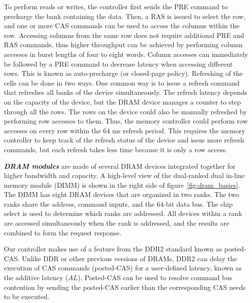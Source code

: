 To perform reads or writes, the controller first sends the PRE command to precharge the bank containing the data. 
Then, a RAS is issued to select the row, and one or more CAS commands can be used to access the columns within the row. 
Accessing columns from the same row does not require additional PRE and RAS commands, thus higher throughput can be achieved by performing column accesses in burst lengths of four to eight words.  
Column accesses can immediately be followed by a PRE command to decrease latency when accessing different rows. 
This is known as auto-precharge (or closed-page policy).
Refreshing of the cells can be done in two ways.
One common way is to issue a refresh command that refreshes all banks of the device simultaneously. 
The refresh latency depends on the capacity of the device, but the DRAM device manages a counter to step through all the rows.
The rows on the device could also be manually refreshed by performing row accesses to them.
Thus, the memory controller could perform row accesses on every row within the 64 ms refresh period.
This requires the memory controller to keep track of the refresh status of the device and issue more refresh commands, but each refresh takes less time because it is only a row access. 

\textbf{\emph{DRAM modules}} are made of several DRAM devices integrated together for higher bandwidth and capacity. 
A high-level view of the dual-ranked dual in-line memory module (DIMM) is shown in the right side of figure~\ref{fig:dram_basics}.
The DIMM has eight DRAM devices that are organized in two ranks.
The two ranks share the address, command inputs, and the 64-bit data bus.
The chip select is used to determine which ranks are addressed.
All devices within a rank are accessed simultaneously when the rank is addressed, and the results are combined to form the request response.  

Our controller makes use of a feature from the DDR2 standard known as posted-CAS.  
Unlike DDR or other previous versions of DRAMs, DDR2 can delay the execution of CAS commands (posted-CAS) for a user-defined latency, known as the additive latency ($AL$). 
Posted-CAS can be used to resolve command bus contention by sending the posted-CAS earlier than the corresponding CAS needs to be executed.

